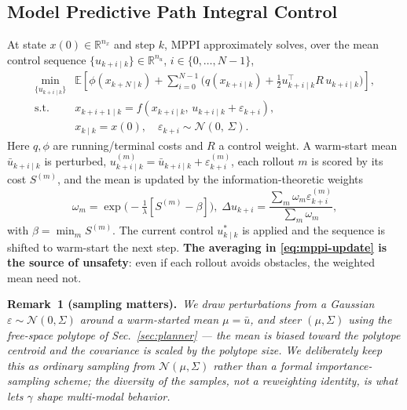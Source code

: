 \documentclass[letterpaper, 10 pt, conference]{ieeeconf}
\newcommand{\Remark}[2][]{\smallskip\noindent\textbf{Remark#1.}~\textit{#2}\smallskip}
\newcommand{\keyword}[1]{\textbf{#1}}
\begin{document}
\subsection{Model Predictive Path Integral Control}
At state $x(0)\in\mathbb{R}^{n_x}$ and step $k$, MPPI approximately solves, over the mean control sequence $\{u_{k+i\mid k}\}\in\mathbb{R}^{n_u}$, $i\in\{0,\dots,N-1\}$,
\begin{subequations}
\label{eq:sc-mppi}
\begin{align}
\min_{\{u_{k+i\mid k}\}}
& \mathbb{E}\!\left[
\phi\!\left(x_{k+N\mid k}\right)
\!+\!\!\sum_{i=0}^{N-1}\!\Big(q(x_{k+i\mid k})\!+\!\tfrac{1}{2}u_{k+i\mid k}^\top R\,u_{k+i\mid k}\Big)
\right]\!, \\
\text{s.t.}\;\;
& x_{k+i+1\mid k}=f\!\left(x_{k+i\mid k},\,u_{k+i\mid k}+\varepsilon_{k+i}\right), \\
& x_{k\mid k}=x(0),\quad \varepsilon_{k+i}\sim\mathcal{N}(0,\,\Sigma).
\end{align}
\end{subequations}
Here $q,\phi$ are running/terminal costs and $R$ a control weight. A warm-start mean $\bar u_{k+i\mid k}$ is perturbed, $u^{(m)}_{k+i\mid k}=\bar u_{k+i\mid k}+\varepsilon^{(m)}_{k+i}$, each rollout $m$ is scored by its cost $S^{(m)}$, and the mean is updated by the information-theoretic weights \cite{williams2017info}
\begin{equation}
\omega_m=\exp\!\Big(\!-\tfrac{1}{\lambda}[S^{(m)}\!-\!\beta]\Big),\;
\Delta u_{k+i}=\frac{\sum_m \omega_m\varepsilon^{(m)}_{k+i}}{\sum_m \omega_m},
\label{eq:mppi-update}
\end{equation}
with $\beta=\min_m S^{(m)}$. The current control $u^*_{k\mid k}$ is applied and the sequence is shifted to warm-start the next step. \keyword{The averaging in \eqref{eq:mppi-update} is the source of unsafety}: even if each rollout avoids obstacles, the weighted mean need not.

\Remark[~1 (sampling matters)]{We draw perturbations from a Gaussian $\varepsilon\sim\mathcal N(0,\Sigma)$ around a warm-started mean $\mu=\bar u$, and \emph{steer $(\mu,\Sigma)$ using the free-space polytope of Sec.~\ref{sec:planner}} --- the mean is biased toward the polytope centroid and the covariance is scaled by the polytope size. We deliberately keep this as ordinary sampling from $\mathcal N(\mu,\Sigma)$ rather than a formal importance-sampling scheme; the diversity of the samples, not a reweighting identity, is what lets $\gamma$ shape multi-modal behavior.}
\end{document}
